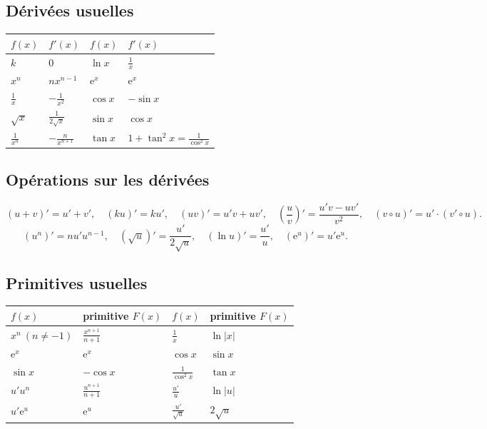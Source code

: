 \subsection{Dérivées usuelles}
\begin{center}\small
\begin{tabular}{@{}ll@{\qquad\qquad}ll@{}}
\toprule
$f(x)$ & $f'(x)$ & $f(x)$ & $f'(x)$\\
\midrule
$k$ & $0$ & $\ln x$ & $\frac1x$\\
$x^n$ & $nx^{n-1}$ & $\mathrm{e}^x$ & $\mathrm{e}^x$\\
$\frac1x$ & $-\frac1{x^2}$ & $\cos x$ & $-\sin x$\\
$\sqrt x$ & $\frac1{2\sqrt x}$ & $\sin x$ & $\cos x$\\
$\frac1{x^n}$ & $-\frac n{x^{n+1}}$ & $\tan x$ & $1+\tan^2x=\frac1{\cos^2x}$\\
\bottomrule
\end{tabular}
\end{center}

\subsection{Opérations sur les dérivées}
\[
(u+v)'=u'+v',\quad (ku)'=ku',\quad (uv)'=u'v+uv',\quad \left(\frac uv\right)'=\frac{u'v-uv'}{v^2},\quad (v\circ u)'=u'\cdot(v'\circ u).
\]
\[
(u^n)'=nu'u^{n-1},\quad (\sqrt u)'=\frac{u'}{2\sqrt u},\quad (\ln u)'=\frac{u'}u,\quad (\mathrm{e}^u)'=u'\mathrm{e}^u.
\]

\subsection{Primitives usuelles}
\begin{center}\small
\begin{tabular}{@{}ll@{\qquad\qquad}ll@{}}
\toprule
$f(x)$ & primitive $F(x)$ & $f(x)$ & primitive $F(x)$\\
\midrule
$x^n\ (n\ne-1)$ & $\frac{x^{n+1}}{n+1}$ & $\frac1x$ & $\ln|x|$\\
$\mathrm{e}^x$ & $\mathrm{e}^x$ & $\cos x$ & $\sin x$\\
$\sin x$ & $-\cos x$ & $\frac1{\cos^2x}$ & $\tan x$\\
$u'u^n$ & $\frac{u^{n+1}}{n+1}$ & $\frac{u'}u$ & $\ln|u|$\\
$u'\mathrm{e}^u$ & $\mathrm{e}^u$ & $\frac{u'}{\sqrt u}$ & $2\sqrt u$\\
\bottomrule
\end{tabular}
\end{center}

